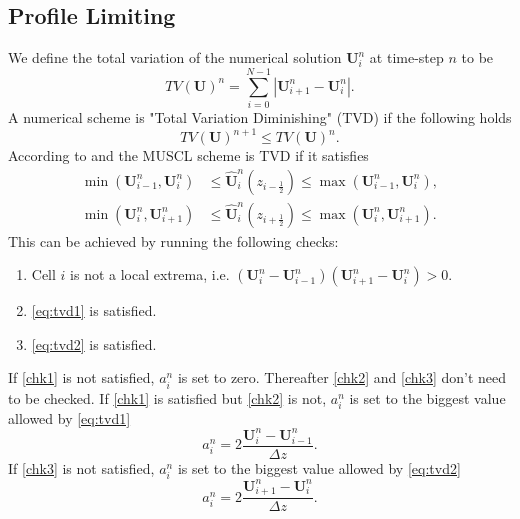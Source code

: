 \documentclass[a4paper, oneside]{discothesis}
\begin{document}
\subsection{Profile Limiting} \label{ssec:pl}
We define the total variation of the numerical solution $\mathbf{U}_i^n$ at time-step $n$ to be 
\begin{equation}
	TV(\mathbf{U})^n = \sum_{i=0}^{N-1} | \mathbf{U}_{i+1}^n - \mathbf{U}_{i}^n|.
\end{equation}
A numerical scheme is "Total Variation Diminishing" (TVD) if the following holds
\begin{equation}
	TV(\mathbf{U})^{n+1} \leq TV(\mathbf{U})^n.
\end{equation}
According to \cite{van1977towards} and \cite{colella1984piecewise} the MUSCL scheme is TVD if it satisfies
\begin{align}
	\min (\mathbf{U}_{i-1}^n, \mathbf{U}_i^n) &\leq \mathbf{\hat{U}}_i^n(z_{i-\frac{1}{2}}) \leq \max (\mathbf{U}_{i-1}^n, \mathbf{U}_i^n), \label{eq:tvd1}\\
	\min (\mathbf{U}_{i}^n, \mathbf{U}_{i+1}^n) &\leq \mathbf{\hat{U}}_i^n(z_{i+\frac{1}{2}}) \leq \max (\mathbf{U}_{i}^n, \mathbf{U}_{i+1}^n).\label{eq:tvd2}
\end{align}
This can be achieved by running the following checks:
\begin{enumerate}
	\item Cell $i$ is not a local extrema, i.e. $(\mathbf{U}_i^n - \mathbf{U}_{i-1}^n)(\mathbf{U}_{i+1}^n-\mathbf{U}_i^n) > 0$. \label{chk1}
	\item \autoref{eq:tvd1} is satisfied. \label{chk2}
	\item \autoref{eq:tvd2} is satisfied. \label{chk3}
\end{enumerate}
If \autoref{chk1} is not satisfied, $a_i^n$ is set to zero.
Thereafter \autoref{chk2} and \autoref{chk3} don't need to be checked.
If \autoref{chk1} is satisfied but \autoref{chk2} is not, $a_i^n$ is set to the biggest value allowed by \autoref{eq:tvd1}
\begin{equation}
	a_i^n = 2 \frac{\mathbf{U}_i^n - \mathbf{U}_{i-1}^n}{\Delta z}.
\end{equation}
If \autoref{chk3} is not satisfied, $a_i^n$ is set to the biggest value allowed by \autoref{eq:tvd2}
\begin{equation}
	a_i^n = 2 \frac{\mathbf{U}_{i+1}^n - \mathbf{U}_{i}^n}{\Delta z}.
\end{equation}
\end{document}
